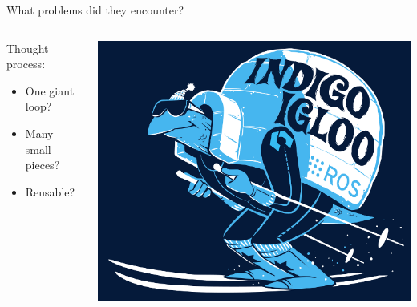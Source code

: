 \documentclass[aspectratio=43]{beamer}
\begin{document}
\begin{frame}{What problems did they encounter?}
\begin{columns}
	\begin{column}{0.55\textwidth}
Thought process:
		\begin{itemize}
			\item One giant loop?
                        \item Many small pieces?
                        \item Reusable? 
		\end{itemize} \end{column} \begin{column}{0.45\textwidth} \centering \includegraphics[width=\textwidth]{fig/indigoigloo_600.png} \end{column}
\end{columns}

\end{frame}
\end{document}
